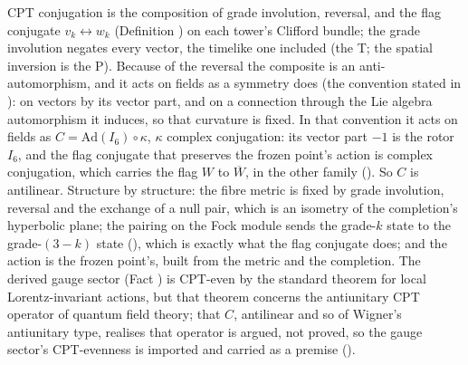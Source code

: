 CPT conjugation is the composition of grade involution, reversal, and the flag conjugate $v_{k} \leftrightarrow w_{k}$ (Definition ) on each tower's Clifford bundle; the grade involution negates every vector, the timelike one included (the T; the spatial inversion is the P). Because of the reversal the composite is an anti-automorphism, and it acts on fields as a symmetry does (the convention stated in ): on vectors by its vector part, and on a connection through the Lie algebra automorphism it induces, so that curvature is fixed. In that convention it acts on fields as $C = \mathrm{Ad}(I_{6}) \circ \kappa$, $\kappa$ complex conjugation: its vector part $-1$ is the rotor $I_{6}$, and the flag conjugate that preserves the frozen point's action is complex conjugation, which carries the flag $W$ to $\overline W$, in the other family (). So $C$ is antilinear. Structure by structure: the fibre metric is fixed by grade involution, reversal and the exchange of a null pair, which is an isometry of the completion's hyperbolic plane; the pairing on the Fock module sends the grade-$k$ state to the grade-$(3-k)$ state \cite[Prop.~5.6]{ButlerT12} (), which is exactly what the flag conjugate does; and the action is the frozen point's, built from the metric and the completion. The derived gauge sector (Fact ) is CPT-even by the standard theorem for local Lorentz-invariant actions, but that theorem concerns the antiunitary CPT operator of quantum field theory; that $C$, antilinear and so of Wigner's antiunitary type, realises that operator is argued, not proved, so the gauge sector's CPT-evenness is imported and carried as a premise ().

